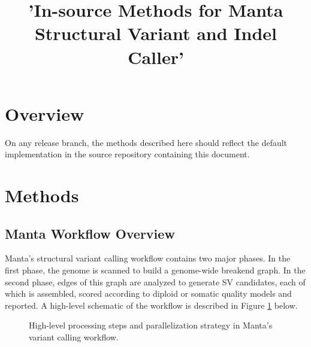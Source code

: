 \documentclass{article}
\title{'In-source Methods for Manta Structural Variant and Indel Caller'}
\begin{document}
\maketitle

\tableofcontents

\section{Overview}

On any release branch, the methods described here should reflect the default implementation in the source repository containing this document.

\section{Methods}

\subsection{Manta Workflow Overview}

Manta's structural variant calling workflow contains two major phases. In the first phase, the genome is scanned to build a genome-wide breakend graph. In the second phase, edges of this graph are analyzed to generate SV candidates, each of which is assembled, scored according to diploid or somatic quality models and reported. A high-level schematic of the workflow is described in Figure \ref{fig:workflow} below.

\begin{figure}[h]
\centerline{
}
\caption{High-level processing steps and parallelization strategy in Manta's variant calling workflow.}
\label{fig:workflow}
\end{figure}
\end{document}
